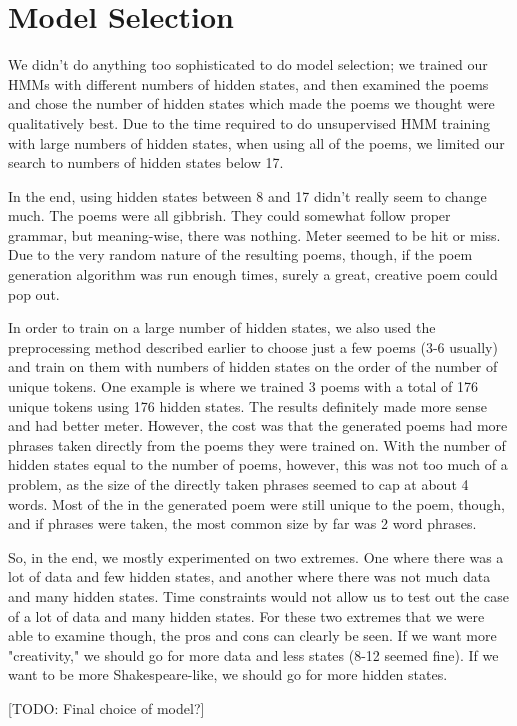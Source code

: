 \section{Model Selection}
We didn't do anything too sophisticated to do model selection; we trained our HMMs with different numbers of hidden states, and then examined the poems and chose the number of hidden states which made the poems we thought were qualitatively best. Due to the time required to do unsupervised HMM training with large numbers of hidden states, when using all of the poems, we limited our search to numbers of hidden states below 17. 
\par In the end, using hidden states between 8 and 17 didn't really seem to change much. The poems were all gibbrish. They could somewhat follow proper grammar, but meaning-wise, there was nothing. Meter seemed to be hit or miss. Due to the very random nature of the resulting poems, though, if the poem generation algorithm was run enough times, surely a great, creative poem could pop out.
\par In order to train on a large number of hidden states, we also used the preprocessing method described earlier to choose just a few poems (3-6 usually) and train on them with numbers of hidden states on the order of the number of unique tokens. One example is where we trained 3 poems with a total of 176 unique tokens using 176 hidden states. The results definitely made more sense and had better meter. However, the cost was that the generated poems had more phrases taken directly from the poems they were trained on. With the number of hidden states equal to the number of poems, however, this was not too much of a problem, as the size of the directly taken phrases seemed to cap at about 4 words. Most of the in the generated poem were still unique to the poem, though, and if phrases were taken, the most common size by far was 2 word phrases.
\par So, in the end, we mostly experimented on two extremes. One where there was a lot of data and few hidden states, and another where there was not much data and many hidden states. Time constraints would not allow us to test out the case of a lot of data and many hidden states. For these two extremes that we were able to examine though, the pros and cons can clearly be seen. If we want more "creativity," we should go for more data and less states (8-12 seemed fine). If we want to be more Shakespeare-like, we should go for more hidden states. 

[TODO: Final choice of model?]

